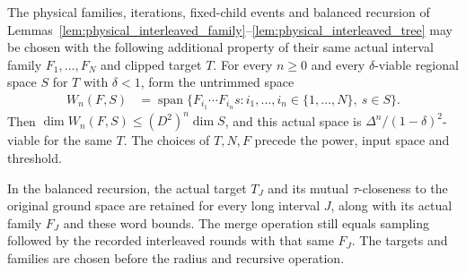 \begin{lemma}
    \label{lem:physical_interleaved_same_word_family}
    \leanok
    The physical families, iterations, fixed-child events and balanced
    recursion of Lemmas~\ref{lem:physical_interleaved_family}--\ref{lem:physical_interleaved_tree}
    may be chosen with the following additional property of their same
    actual interval family $F_1,\ldots,F_N$ and clipped target $T$.
    For every $n\ge0$ and every $\delta$-viable regional space $S$ for $T$
    with $\delta<1$, form the untrimmed space
    \begin{align}
        W_n(F,S) & =\operatorname{span}\{
        F_{i_1}\cdots F_{i_n}s:i_1,\ldots,i_n\in\{1,\ldots,N\},\ s\in S\}.
        \label{eq:interleaved_same_word_image}
    \end{align}
    Then $\dim W_n(F,S)\le(D^2)^n\dim S$, and this actual space is
    $\Delta^n/(1-\delta)^2$-viable for the same $T$. The choices of
    $T,N,F$ precede the power, input space and threshold.

    In the balanced recursion, the actual target $T_J$ and its mutual
    $\tau$-closeness to the original ground space are retained for every
    long interval $J$, along with its actual family $F_J$ and these word
    bounds. The merge operation still equals sampling followed by the
    recorded interleaved rounds with that same $F_J$. The targets and
    families are chosen before the radius and recursive operation.
\end{lemma}
